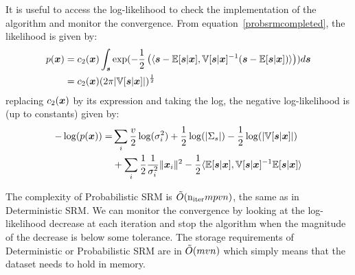 It is useful to access the log-likelihood to check the implementation of the
algorithm and monitor the convergence. From equation~\eqref{probsrmcompleted},
the likelihood is given by:
\begin{align}
  p(\boldsymbol{x}) &= c_2(\boldsymbol{x}) \int_{\boldsymbol{s}} \exp(-\frac12 \left( \langle  \boldsymbol{s} - \mathbb{E}[\boldsymbol{s} | \boldsymbol{x}], \mathbb{V}[\boldsymbol{s} | \boldsymbol{x}]^{-1} ( \boldsymbol{s} - \mathbb{E}[\boldsymbol{s} | \boldsymbol{x}])  \rangle \right)) d\boldsymbol{s} \\
         &= c_2(\boldsymbol{x}) (2 \pi |\mathbb{V}[\boldsymbol{s} | \boldsymbol{x}]|)^{\frac12}
\end{align}
replacing $c_2(\boldsymbol{x})$ by its expression and taking the log, the negative
log-likelihood is (up to constants) given by:
\begin{align}
  -\log(p(\boldsymbol{x})) = &\sum_i \frac{v}{2} \log(\sigma_i^2) + \frac12 \log(|\Sigma_s|) - \frac12 \log(|\mathbb{V}[\boldsymbol{s} | \boldsymbol{x}]|) \\ &+ \sum_i
  \frac12 \frac1{\sigma_i^2}\|\boldsymbol{x}_i\|^2 - \frac12 \langle  \mathbb{E}[\boldsymbol{s} | \boldsymbol{x}], \mathbb{V}[\boldsymbol{s} | \boldsymbol{x}]^{-1} \mathbb{E}[\boldsymbol{s} | \boldsymbol{x}] \rangle
\end{align}

The complexity of Probabilistic SRM is $\tilde{O}(\mathrm{n_{iter}} mpvn)$, the same as in
Deterministic SRM.
We can monitor the convergence by looking at the log-likelihood decrease at each iteration
and stop the algorithm when the magnitude of the decrease is below some
tolerance.
The storage requirements of Deterministic or Probabilistic SRM are in
$\tilde{O}(mvn)$ which simply means that the dataset needs to hold in memory.





